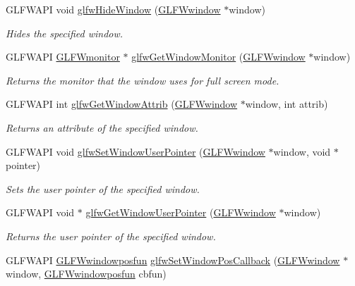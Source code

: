 \begin{DoxyCompactItemize}
G\+L\+F\+W\+A\+P\+I void \hyperlink{group__window_gaa17e287d521544bdeceafa09ac036e20}{glfw\+Hide\+Window} (\hyperlink{group__window_ga3c96d80d363e67d13a41b5d1821f3242}{G\+L\+F\+Wwindow} $\ast$window)
\begin{DoxyCompactList}\small\item\em Hides the specified window. \end{DoxyCompactList}\item 
G\+L\+F\+W\+A\+P\+I \hyperlink{group__monitor_ga8d9efd1cde9426692c73fe40437d0ae3}{G\+L\+F\+Wmonitor} $\ast$ \hyperlink{group__window_gaf1525cb3bccd5789c702cc9676ef3403}{glfw\+Get\+Window\+Monitor} (\hyperlink{group__window_ga3c96d80d363e67d13a41b5d1821f3242}{G\+L\+F\+Wwindow} $\ast$window)
\begin{DoxyCompactList}\small\item\em Returns the monitor that the window uses for full screen mode. \end{DoxyCompactList}\item 
G\+L\+F\+W\+A\+P\+I int \hyperlink{group__window_ga1bb0c7e100418e284dbb800789c63d40}{glfw\+Get\+Window\+Attrib} (\hyperlink{group__window_ga3c96d80d363e67d13a41b5d1821f3242}{G\+L\+F\+Wwindow} $\ast$window, int attrib)
\begin{DoxyCompactList}\small\item\em Returns an attribute of the specified window. \end{DoxyCompactList}\item 
G\+L\+F\+W\+A\+P\+I void \hyperlink{group__window_gacc9e68faee3c1763b54cd9bc405cf43e}{glfw\+Set\+Window\+User\+Pointer} (\hyperlink{group__window_ga3c96d80d363e67d13a41b5d1821f3242}{G\+L\+F\+Wwindow} $\ast$window, void $\ast$pointer)
\begin{DoxyCompactList}\small\item\em Sets the user pointer of the specified window. \end{DoxyCompactList}\item 
G\+L\+F\+W\+A\+P\+I void $\ast$ \hyperlink{group__window_ga0a9ff3b4bf8589e9518e8816d06a8f50}{glfw\+Get\+Window\+User\+Pointer} (\hyperlink{group__window_ga3c96d80d363e67d13a41b5d1821f3242}{G\+L\+F\+Wwindow} $\ast$window)
\begin{DoxyCompactList}\small\item\em Returns the user pointer of the specified window. \end{DoxyCompactList}\item 
G\+L\+F\+W\+A\+P\+I \hyperlink{group__window_gafd8db81fdb0e850549dc6bace5ed697a}{G\+L\+F\+Wwindowposfun} \hyperlink{group__window_gaea610899c4cb070dcd655c6de1fe1d2c}{glfw\+Set\+Window\+Pos\+Callback} (\hyperlink{group__window_ga3c96d80d363e67d13a41b5d1821f3242}{G\+L\+F\+Wwindow} $\ast$window, \hyperlink{group__window_gafd8db81fdb0e850549dc6bace5ed697a}{G\+L\+F\+Wwindowposfun} cbfun)

\end{DoxyCompactItemize}
